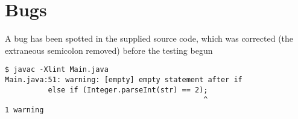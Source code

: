 \documentclass[10pt]{report}
\begin{document}


%
%

\appendix
\chapter{Bugs}

A bug has been spotted in the supplied source code, which was corrected (the extraneous semicolon removed) before the testing begun

\begin{verbatim}
$ javac -Xlint Main.java
Main.java:51: warning: [empty] empty statement after if
          else if (Integer.parseInt(str) == 2);
                                              ^
1 warning
\end{verbatim}
\end{document}
